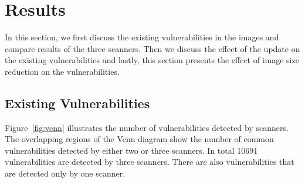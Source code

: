 \documentclass[a4paper,num-refs]{oup-contemporary}
\begin{document}

\section{Results}

In this section,
we first discuss the existing vulnerabilities in the images and compare
results of the three scanners. Then we discuss the effect of the update on the
existing vulnerabilities and lastly, this section presents the effect of image size reduction on the
vulnerabilities.

\subsection{Existing Vulnerabilities}

Figure~\ref{fig:venn} illustrates the number of vulnerabilities detected by scanners. The
overlapping regions of the Venn diagram show the number of common vulnerabilities detected by either two or
three scanners. In total 10691 vulnerabilities are detected by three scanners.
There are also vulnerabilities that are detected only by one scanner.
\end{document}
